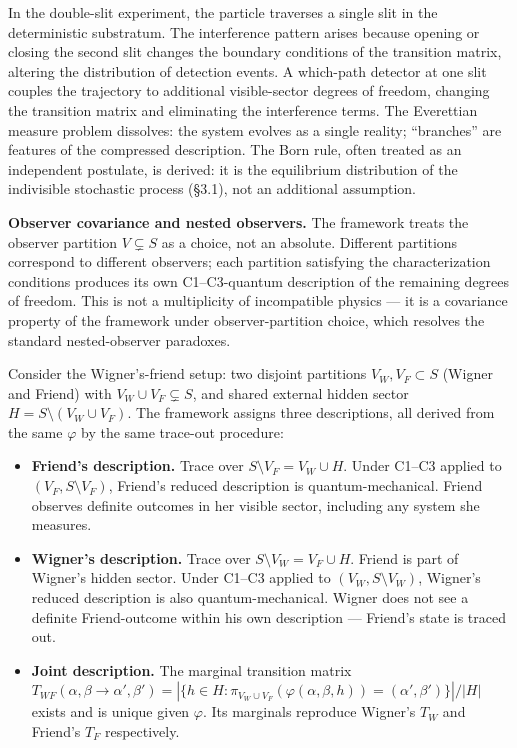 \documentclass[
]{article}
\providecommand{\tightlist}{%
  \setlength{\itemsep}{0pt}\setlength{\parskip}{0pt}}
\begin{document}
In the double-slit experiment, the particle traverses a single slit in
the deterministic substratum. The interference pattern arises because
opening or closing the second slit changes the boundary conditions of
the transition matrix, altering the distribution of detection events. A
which-path detector at one slit couples the trajectory to additional
visible-sector degrees of freedom, changing the transition matrix and
eliminating the interference terms. The Everettian measure problem
dissolves: the system evolves as a single reality; ``branches'' are
features of the compressed description. The Born rule, often treated as
an independent postulate, is derived: it is the equilibrium distribution
of the indivisible stochastic process (§3.1), not an additional
assumption.

\textbf{Observer covariance and nested observers.} The framework treats
the observer partition \(V \subsetneq S\) as a choice, not an absolute.
Different partitions correspond to different observers; each partition
satisfying the characterization conditions produces its own
C1--C3-quantum description of the remaining degrees of freedom. This is
not a multiplicity of incompatible physics --- it is a covariance
property of the framework under observer-partition choice, which
resolves the standard nested-observer paradoxes.

Consider the Wigner's-friend setup: two disjoint partitions
\(V_W, V_F \subset S\) (Wigner and Friend) with
\(V_W \cup V_F \subsetneq S\), and shared external hidden sector
\(H = S \setminus (V_W \cup V_F)\). The framework assigns three
descriptions, all derived from the same \(\varphi\) by the same
trace-out procedure:

\begin{itemize}
\tightlist
\item
  \textbf{Friend's description.} Trace over
  \(S \setminus V_F = V_W \cup H\). Under C1--C3 applied to
  \((V_F, S \setminus V_F)\), Friend's reduced description is
  quantum-mechanical. Friend observes definite outcomes in her visible
  sector, including any system she measures.
\item
  \textbf{Wigner's description.} Trace over
  \(S \setminus V_W = V_F \cup H\). Friend is part of Wigner's hidden
  sector. Under C1--C3 applied to \((V_W, S \setminus V_W)\), Wigner's
  reduced description is also quantum-mechanical. Wigner does not see a
  definite Friend-outcome within his own description --- Friend's state
  is traced out.
\item
  \textbf{Joint description.} The marginal transition matrix
  \(T_{WF}(\alpha, \beta \to \alpha', \beta') = |\{h \in H : \pi_{V_W \cup V_F}(\varphi(\alpha, \beta, h)) = (\alpha', \beta')\}|/|H|\)
  exists and is unique given \(\varphi\). Its marginals reproduce
  Wigner's \(T_W\) and Friend's \(T_F\) respectively.
\end{itemize}
\end{document}
